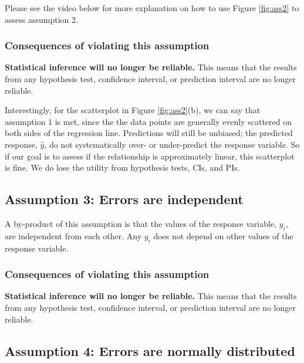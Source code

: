 \documentclass[
]{book}
\begin{document}
Please see the video below for more explanation on how to use Figure \ref{fig:ass2} to assess assumption 2.

\hypertarget{consequences-of-violating-this-assumption-1}{%
\subsubsection{Consequences of violating this assumption}\label{consequences-of-violating-this-assumption-1}}

\textbf{Statistical inference will no longer be reliable.} This means that the results from any hypothesis test, confidence interval, or prediction interval are no longer reliable.

Interestingly, for the scatterplot in Figure \ref{fig:ass2}(b), we can say that assumption 1 is met, since the the data points are generally evenly scattered on both sides of the regression line. Predictions will still be unbiased; the predicted response, \(\hat{y}\), do not systematically over- or under-predict the response variable. So if our goal is to assess if the relationship is approximately linear, this scatterplot is fine. We do lose the utility from hypothesis tests, CIs, and PIs.

\hypertarget{assumption-3-errors-are-independent}{%
\subsection{Assumption 3: Errors are independent}\label{assumption-3-errors-are-independent}}

A by-product of this assumption is that the values of the response variable, \(y_i\), are independent from each other. Any \(y_i\) does not depend on other values of the response variable.

\hypertarget{consequences-of-violating-this-assumption-2}{%
\subsubsection{Consequences of violating this assumption}\label{consequences-of-violating-this-assumption-2}}

\textbf{Statistical inference will no longer be reliable.} This means that the results from any hypothesis test, confidence interval, or prediction interval are no longer reliable.

\hypertarget{assumption-4-errors-are-normally-distributed}{%
\subsection{Assumption 4: Errors are normally distributed}\label{assumption-4-errors-are-normally-distributed}}
\end{document}
